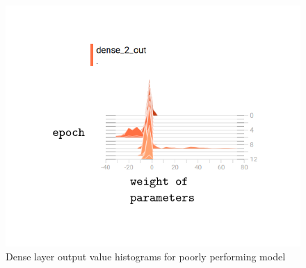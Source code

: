 \documentclass{article}
\begin{document}
{\begin{figure}[h]
  \includegraphics[scale=0.8]{baddenseout.pdf}
  \caption{Dense layer output value histograms for poorly performing model}
  \label{fig:baddenseout}
\end{figure}

}
\end{document}
